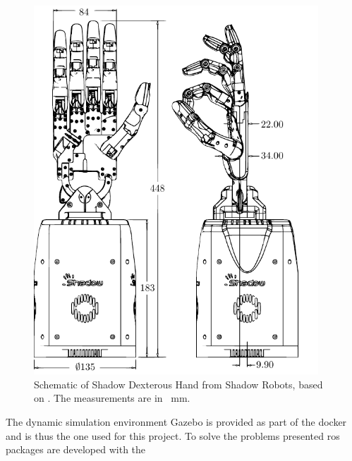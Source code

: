 	\begin{minipage}{0.45\textwidth}
	\begin{figure}[H]
		\begin{small}
			\begin{center}
				\includegraphics[width=0.95\textwidth]{chapters/introduction/fig/shadow-dex-hand-vector.pdf}
			\end{center}
			\caption{Schematic of Shadow Dexterous Hand from Shadow Robots, based on \cite{shadow-dex-hand-schematic}. The measurements are in \SI{}{\milli\metre}.}
			\label{fig:shadow-dex-hand-schematic}
		\end{small}
	\end{figure}
\end{minipage}

The dynamic simulation environment Gazebo \cite{gazebo} is provided as part of the \gls{docker} and is thus the one used for this project. \medskip
To solve the problems presented \gls{ros} packages are developed with the 


